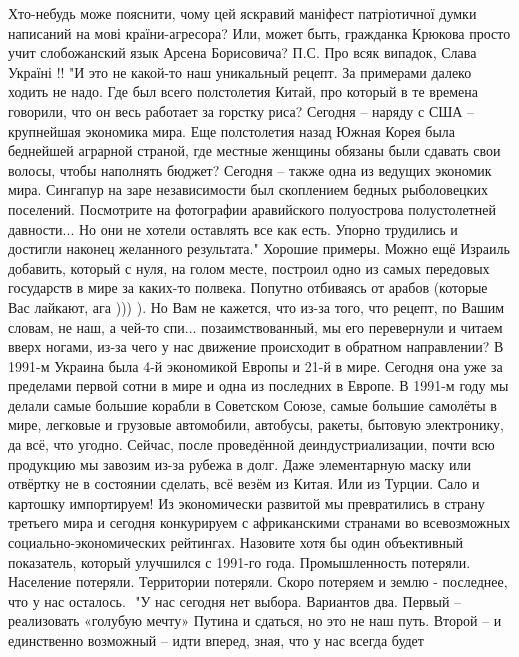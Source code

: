 \begin{itemize}
Хто-небудь може пояснити, чому цей яскравий маніфест патріотичної думки
написаний на мові країни-агресора? Или, может быть, гражданка Крюкова просто
учит слобожанский язык Арсена Борисовича?
П.С. Про всяк випадок, Слава Україні !!
"И это не какой-то наш уникальный рецепт. За примерами далеко ходить не надо.
Где был всего полстолетия Китай, про который в те времена говорили, что он весь
работает за горстку риса? Сегодня – наряду с США – крупнейшая экономика мира.
Еще полстолетия назад Южная Корея была беднейшей аграрной страной, где местные
женщины обязаны были сдавать свои волосы, чтобы наполнять бюджет? Сегодня –
также одна из ведущих экономик мира. Сингапур на заре независимости был
скоплением бедных рыболовецких поселений. Посмотрите на фотографии аравийского
полуострова полустолетней давности...
Но они не хотели оставлять все как есть. Упорно трудились и достигли наконец желанного результата."
Хорошие примеры. Можно ещё Израиль добавить, который с нуля, на голом месте,
построил одно из самых передовых государств в мире за каких-то полвека. Попутно
отбиваясь от арабов (которые Вас лайкают, ага ))) ). Но Вам не кажется, что
из-за того, что рецепт, по Вашим словам, не наш, а чей-то спи...
позаимствованный, мы его перевернули и читаем вверх ногами, из-за чего у нас
движение происходит в обратном направлении? В 1991-м Украина была 4-й
экономикой Европы и 21-й в мире. 
Сегодня она уже за пределами первой сотни в
мире и одна из последних в Европе. В 1991-м году мы делали самые большие
корабли в Советском Союзе, самые большие самолёты в мире, легковые и грузовые
автомобили, автобусы, ракеты, бытовую электронику, да всё, что угодно. Сейчас,
после проведённой деиндустриализации, почти всю продукцию мы завозим из-за
рубежа в долг. Даже элементарную маску или отвёртку не в состоянии сделать, всё
везём из Китая. Или из Турции. Сало и картошку импортируем! Из экономически
развитой мы превратились в страну третьего мира и сегодня конкурируем с
африканскими странами во всевозможных социально-экономических рейтингах.
Назовите хотя бы один объективный показатель, который улучшился с 1991-го года.
Промышленность потеряли. Население потеряли. Территории потеряли. Скоро
потеряем и землю - последнее, что у нас осталось.
⁠
"У нас сегодня нет выбора. Вариантов два. Первый – реализовать «голубую мечту» Путина и сдаться, но это не наш путь.
Второй – и единственно возможный – идти вперед, зная, что у нас всегда будет

\end{itemize}
